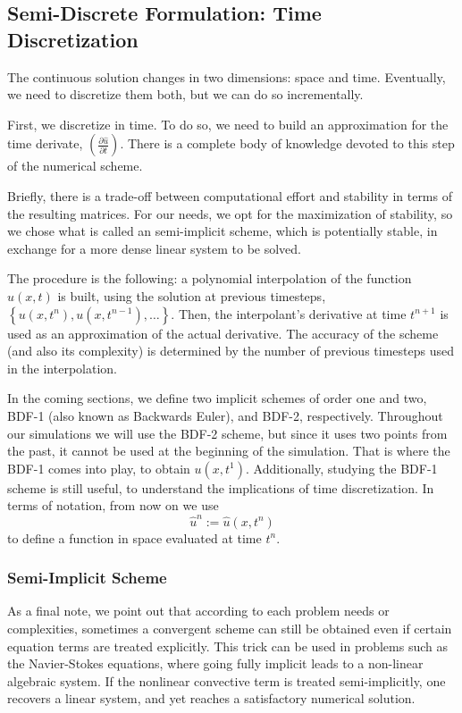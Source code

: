 \documentclass[../../thesis.tex]{subfiles}
\begin{document}
\subsection{Semi-Discrete Formulation: Time Discretization}
The continuous solution changes in two dimensions: space and time.
Eventually, we need to discretize them both, but we can do so incrementally.

First, we discretize in time. 
To do so, we need to build an approximation for the time derivate, $\left(\frac{\partial \hat{u}}{\partial t}\right)$.
There is a complete body of knowledge devoted to this step of the numerical scheme.

Briefly, there is a trade-off between computational effort and stability in terms of the resulting matrices.
For our needs, we opt for the maximization of stability, so we chose what is called an semi-implicit scheme, 
which is potentially stable, in exchange for a more dense linear system to be solved.

The procedure is the following: a polynomial interpolation of the function $u(x,t)$ is built, 
using the solution at previous timesteps, $\left\{u(x,t^{n}), u(x,t^{n-1}), \ldots\right\}$.
Then, the interpolant's derivative at time $t^{n+1}$ is used as an approximation of the actual derivative.
The accuracy of the scheme (and also its complexity) is determined by the number of previous timesteps used in the interpolation. 

In the coming sections, we define two implicit schemes of order one and two, BDF-1 (also known as Backwards Euler), and BDF-2, respectively.
Throughout our simulations we will use the BDF-2 scheme, but since it uses two points from the past, 
it cannot be used at the beginning of the simulation. 
That is where the BDF-1 comes into play, to obtain $u(x,t^1)$.
Additionally, studying the BDF-1 scheme is still useful, to understand the implications of time discretization. 
In terms of notation, from now on we use
\begin{equation}
    \hat{u}^n := \hat{u}(x,t^n)
\end{equation}
to define a function in space evaluated at time $t^n$.

\subsubsection{Semi-Implicit Scheme}
As a final note, we point out that according to each problem needs or complexities, 
sometimes a convergent scheme can still be obtained even if certain equation terms are treated explicitly.
This trick can be used in problems such as the Navier-Stokes equations, 
where going fully implicit leads to a non-linear algebraic system. 
If the nonlinear convective term is treated semi-implicitly, 
one recovers a linear system, and yet reaches a satisfactory numerical solution.
\end{document}
